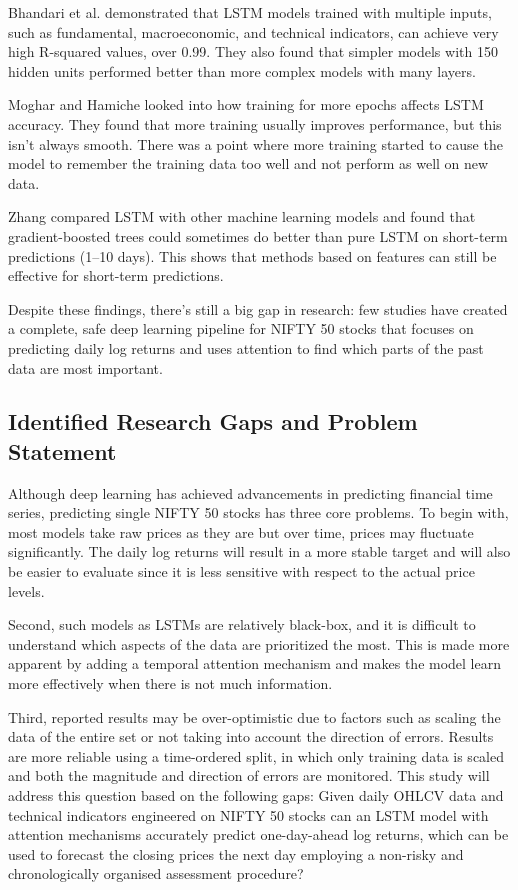 \documentclass[conference]{IEEEtran}
\begin{document}
Bhandari et al. \cite{b1} demonstrated that LSTM models trained with multiple inputs, such as fundamental, macroeconomic, and technical indicators, can achieve very high R-squared values, over 0.99. They also found that simpler models with 150 hidden units performed better than more complex models with many layers.

Moghar and Hamiche \cite{b6} looked into how training for more epochs affects LSTM accuracy. They found that more training usually improves performance, but this isn't always smooth. There was a point where more training started to cause the model to remember the training data too well and not perform as well on new data.

Zhang \cite{b9} compared LSTM with other machine learning models and found that gradient-boosted trees could sometimes do better than pure LSTM on short-term predictions (1--10 days). This shows that methods based on features can still be effective for short-term predictions.

Despite these findings, there's still a big gap in research: few studies have created a complete, safe deep learning pipeline for NIFTY 50 stocks that focuses on predicting daily log returns and uses attention to find which parts of the past data are most important.

\subsection{Identified Research Gaps and Problem Statement}

Although deep learning has achieved advancements in predicting financial time series, predicting single NIFTY 50 stocks has three core problems. To begin with, most models take raw prices as they are but over time, prices may fluctuate significantly. The daily log returns will result in a more stable target and will also be easier to evaluate since it is less sensitive with respect to the actual price levels.

Second, such models as LSTMs are relatively black-box, and it is difficult to understand which aspects of the data are prioritized the most. This is made more apparent by adding a temporal attention mechanism and makes the model learn more effectively when there is not much information.

Third, reported results may be over-optimistic due to factors such as scaling the data of the entire set or not taking into account the direction of errors. Results are more reliable using a time-ordered split, in which only training data is scaled and both the magnitude and direction of errors are monitored. This study will address this question based on the following gaps: Given daily OHLCV data and technical indicators engineered on NIFTY 50 stocks can an LSTM model with attention mechanisms accurately predict one-day-ahead log returns, which can be used to forecast the closing prices the next day employing a non-risky and chronologically organised assessment procedure?
\end{document}
